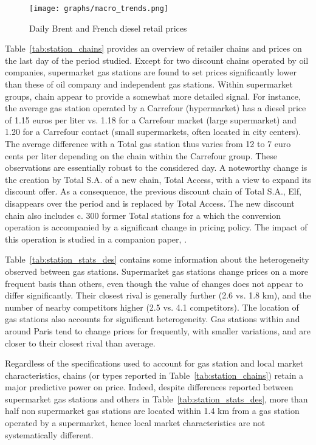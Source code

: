 \documentclass[english]{article}
\begin{document}
\begin{figure}[H]
    \caption{Daily Brent and French diesel retail prices}
	\centering
		\texttt{[image: graphs/macro\_trends.png]}
\label{fig:brent_and_diesel}
\end{figure}

Table~\ref{tab:station_chains} provides an overview of retailer chains and prices on the last day of the period studied. Except for two discount chains operated by oil companies, supermarket gas stations are found to set prices significantly lower than these of oil company and independent gas stations. Within supermarket groups, chain appear to provide a somewhat more detailed signal. For instance, the average gas station operated by a Carrefour (hypermarket) has a diesel price of 1.15 euros per liter vs. 1.18 for a Carrefour market (large supermarket) and 1.20 for a Carrefour contact (small supermarkets, often located in city centers). The average difference with a Total gas station thus varies from 12 to 7 euro cents per liter depending on the chain within the Carrefour group. These observations are essentially robust to the considered day. A noteworthy change is the creation by Total S.A. of a new chain, Total Access, with a view to expand its discount offer. As a consequence, the previous discount chain of Total S.A., Elf, disappears over the period and is replaced by Total Access. The new discount chain also includes c. 300 former Total stations for a which the conversion operation is accompanied by a significant change in pricing policy. The impact of this operation is studied in a companion paper, \cite{CHA16}.

Table~\ref{tab:station_stats_des} contains some information about the heterogeneity observed between gas stations. Supermarket gas stations change prices on a more frequent basis than others, even though the value of changes does not appear to differ significantly. Their closest rival is generally further (2.6 vs. 1.8 km), and the number of nearby competitors higher (2.5 vs. 4.1 competitors). The location of gas stations also accounts for significant heterogeneity. Gas stations within and around Paris tend to change prices for frequently, with smaller variations, and are closer to their closest rival than average.

Regardless of the specifications used to account for gas station and local market characteristics, chains (or types reported in Table~\ref{tab:station_chains}) retain a major predictive power on price. Indeed, despite differences reported between supermarket gas stations and others in Table~\ref{tab:station_stats_des}, more than half non supermarket gas stations are located within 1.4 km from a gas station operated by a supermarket, hence local market characteristics are not systematically different.
\end{document}
